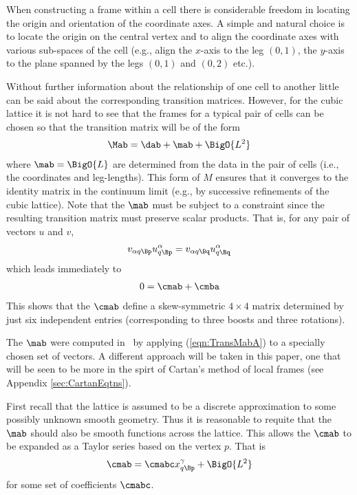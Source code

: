 \documentclass[a4paper,12pt]{article}
\numberwithin{equation}{section}
\begin{document}
When constructing a frame within a cell there is considerable freedom in locating the origin
and orientation of the coordinate axes. A simple and natural choice is to locate the origin
on the central vertex and to align the coordinate axes with various sub-spaces of the cell
(e.g., align the $x$-axis to the leg $(0,1)$, the $y$-axis to the plane spanned by the legs
$(0,1)$ and $(0,2)$ etc.).

Without further information about the relationship of one cell to another little can be said
about the corresponding transition matrices. However, for the cubic lattice it is not
hard to see that the frames for a typical pair of cells can be chosen so that the transition
matrix will be of the form
\begin{align}
   \label{eqn:TransMabB}
   \Mab = \dab + \mab + \BigO{L^2}
\end{align}
where $\mab = \BigO{L}$ are determined from the data in the pair of cells (i.e., the
coordinates and leg-lengths). This form of $M$ ensures that it converges to the identity
matrix in the continuum limit (e.g., by successive refinements of the cubic lattice).
Note that the $\mab$ must be subject to a constraint since the resulting transition matrix
must preserve scalar products. That is, for any pair of vectors $u$ and $v$,
\begin{align}
   v_{\alpha q\Bp} u^\alpha_{q\Bp} = v_{\alpha q\Bq} u^\alpha_{q\Bq}
\end{align}
which leads immediately to
\begin{align}
   \label{eqn:AntisymmMab}
   0 = \cmab + \cmba
\end{align}
This shows that the $\cmab$ define a skew-symmetric $4\times4$ matrix determined by just six
independent entries (corresponding to three boosts and three rotations).

The $\mab$ were computed in~\cite{brewin:2014-01} by applying (\ref{eqn:TransMabA}) to a
specially chosen set of vectors. A different approach will be taken in this paper, one that
will be seen to be more in the spirt of Cartan's method of local frames (see Appendix
\ref{sec:CartanEqtns}).

First recall that the lattice is assumed to be a discrete approximation to some possibly
unknown smooth geometry. Thus it is reasonable to requite that the $\mab$ should also be
smooth functions across the lattice. This allows the $\cmab$ to be expanded as a Taylor
series based on the vertex $p$. That is
\begin{align}
   \cmab = \cmabc x^\gamma_{q\Bp} + \BigO{L^2}
\end{align}
for some set of coefficients $\cmabc$.
\end{document}
